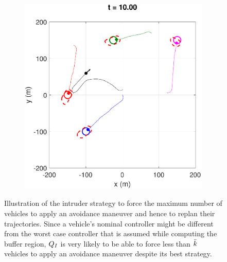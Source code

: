 \begin{figure}
\begin{subfigure}{.5\columnwidth}
  \subcaption{}
  \label{fig:normalcase2}
\end{subfigure}
\begin{subfigure}{.5\columnwidth}
  \centering
  \includegraphics[width=\columnwidth]{figs/simulate_bufferRegion_properties_normal_3}
  \subcaption{}
  \label{fig:normalcase3}
\end{subfigure}%
\caption{Illustration of the intruder strategy to force the maximum number of vehicles to apply an avoidance maneuver and hence to replan their trajectories. Since a vehicle's nominal controller might be different from the worst case controller that is assumed while computing the buffer region, $Q_{I}$ is very likely to be able to force less than $\bar{k}$ vehicles to apply an avoidance maneuver despite its best strategy.}
\label{fig:normalcase}
\end{figure}         


